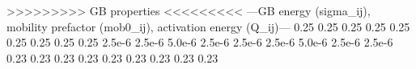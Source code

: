>>>>>>>>> GB properties <<<<<<<<<
---GB energy (sigma_ij), mobility prefactor (mob0_ij), activation energy (Q_ij)---
0.25 0.25 0.25
0.25 0.25 0.25
0.25 0.25 0.25
2.5e-6 2.5e-6 5.0e-6
2.5e-6 2.5e-6 2.5e-6
5.0e-6 2.5e-6 2.5e-6
0.23	0.23	0.23
0.23	0.23	0.23
0.23	0.23	0.23
